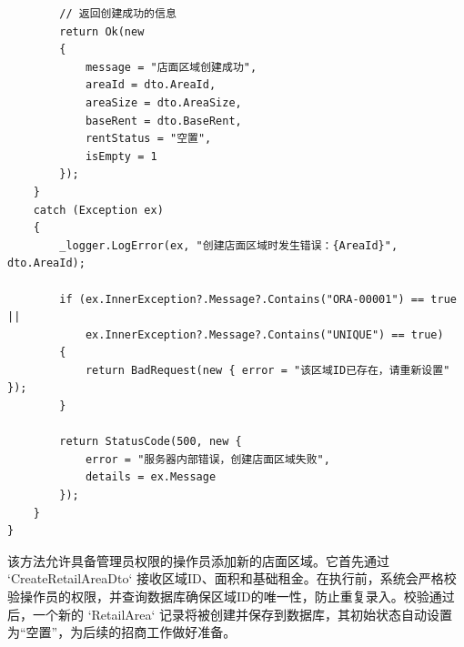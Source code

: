 \documentclass[]{article}
\begin{document}
\begin{verbatim}
        // 返回创建成功的信息
        return Ok(new
        {
            message = "店面区域创建成功",
            areaId = dto.AreaId,
            areaSize = dto.AreaSize,
            baseRent = dto.BaseRent,
            rentStatus = "空置",
            isEmpty = 1
        });
    }
    catch (Exception ex)
    {
        _logger.LogError(ex, "创建店面区域时发生错误：{AreaId}", dto.AreaId);
        
        if (ex.InnerException?.Message?.Contains("ORA-00001") == true || 
            ex.InnerException?.Message?.Contains("UNIQUE") == true)
        {
            return BadRequest(new { error = "该区域ID已存在，请重新设置" });
        }
        
        return StatusCode(500, new { 
            error = "服务器内部错误，创建店面区域失败",
            details = ex.Message
        });
    }
}
\end{verbatim}
该方法允许具备管理员权限的操作员添加新的店面区域。它首先通过 `CreateRetailAreaDto` 接收区域ID、面积和基础租金。在执行前，系统会严格校验操作员的权限，并查询数据库确保区域ID的唯一性，防止重复录入。校验通过后，一个新的 `RetailArea` 记录将被创建并保存到数据库，其初始状态自动设置为“空置”，为后续的招商工作做好准备。
\end{document}
